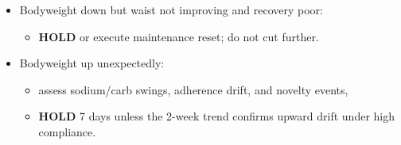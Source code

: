 \documentclass[10pt]{article}
\begin{document}
\begin{itemize}
\begin{itemize}
\end{itemize}
\item Bodyweight down but waist not improving and recovery poor:
\begin{itemize}
\item \textbf{HOLD} or execute maintenance reset; do not cut further.
\end{itemize}
\item Bodyweight up unexpectedly:
\begin{itemize}
\item assess sodium/carb swings, adherence drift, and novelty events,
\item \textbf{HOLD} 7 days unless the 2-week trend confirms upward drift under high compliance.
\end{itemize}
\end{itemize}
\end{document}
